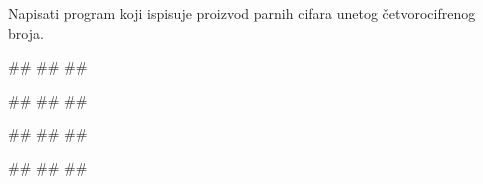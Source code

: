 \begin{Exercise}[label=p1.2_04] 
Napisati program koji ispisuje proizvod parnih cifara unetog četvorocifrenog broja. 

\begin{miditest}
\begin{upotreba}{1}
#\naslovInt#
##
##
\end{upotreba}
\end{miditest}
\begin{miditest}
\begin{upotreba}{2}
#\naslovInt#
##
##
\end{upotreba}
\end{miditest}

\begin{miditest}
\begin{upotreba}{3}
#\naslovInt#
##
##
\end{upotreba}
\end{miditest}
\begin{miditest}
\begin{upotreba}{4}
#\naslovInt#
##
##
\end{upotreba}
\end{miditest}


\end{Exercise}
\begin{Answer}[ref=p1.2_04]
\end{Answer}






